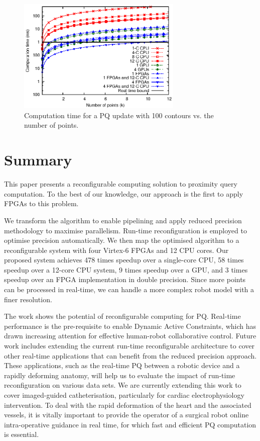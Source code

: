 \begin{figure}[ht]
\begin{center}
\includegraphics[width=0.7\textwidth]{mixed_precision/figures/fig_scalability}
\end{center}
\caption{Computation time for a PQ update with 100 contours vs. the number of points.}
\label{fig:scalability}
\end{figure}

\section{Summary}
\label{sec:summary}

This paper presents a reconfigurable computing solution to proximity query computation.
To the best of our knowledge, our approach is the first to apply FPGAs to this problem.

We transform the algorithm to enable pipelining and apply reduced precision methodology to maximise parallelism.
Run-time reconfiguration is employed to optimise precision automatically.
We then map the optimised algorithm to a reconfigurable system with four Virtex-6 FPGAs and 12 CPU cores.
Our proposed system achieves 478 times speedup over a single-core CPU, 58 times speedup over a 12-core CPU system, 9 times speedup over a GPU,
and 3 times speedup over an FPGA implementation in double precision.
Since more points can be processed in real-time, we can handle a more complex robot model with a finer resolution.

The work shows the potential of reconfigurable computing for PQ. 
Real-time performance is the pre-requisite to enable Dynamic Active Constraints, which has drawn increasing attention for effective human-robot collaborative control. 
Future work includes extending the current run-time reconfigurable architecture to cover other real-time applications that can benefit from the reduced precision approach. 
These applications, such as the real-time PQ between a robotic device and a rapidly deforming anatomy, will help us to evaluate the impact of run-time reconfiguration on various data sets. 
We are currently extending this work to cover imaged-guided catheterisation, particularly for cardiac electrophysiology intervention. 
To deal with the rapid deformation of the heart and the associated vessels, it is vitally important to provide the operator of a surgical robot online intra-operative guidance in real time, for which fast and efficient PQ computation is essential.

